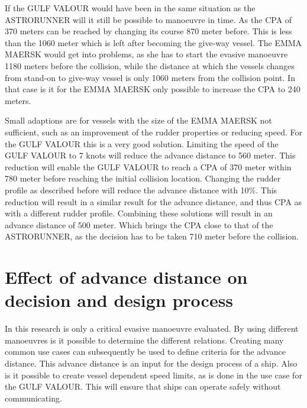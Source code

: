 If the GULF VALOUR would have been in the same situation as the ASTRORUNNER will it still be possible to manoeuvre in time. As the CPA of 370 meters can be reached by changing its course 870 meter before. This is less than the 1060 meter which is left after becoming the give-way vessel. 
The EMMA MAERSK would get into problems, as she has to start the evasive manoeuvre 1180 meters before the collision, while the distance at which the vessels changes from stand-on to give-way vessel is only 1060 meters from the collision point. In that case is it for the EMMA MAERSK only possible to increase the CPA to 240 meters.

Small adaptions are for vessels with the size of the EMMA MAERSK not sufficient, such as an improvement of the rudder properties or reducing speed. For the GULF VALOUR this is a very good solution. Limiting the speed of the GULF VALOUR to 7 knots will reduce the advance distance to 560 meter. This reduction will enable the GULF VALOUR to reach a CPA of 370 meter within 780 meter before reaching the initial collision location.
Changing the rudder profile as described before will reduce the advance distance with 10\%. This reduction will result in a similar result for the advance distance, and thus CPA as with a different rudder profile.
Combining these solutions will result in an advance distance of 500 meter. Which brings the CPA close to that of the ASTRORUNNER, as the decision has to be taken 710 meter before the collision.


\section{Effect of advance distance on decision and design process}
In this research is only a critical evasive manoeuvre evaluated. By using different manoeuvres is it possible to determine the different relations. Creating many common use cases can subsequently be used to define criteria for the advance distance. This advance distance is an input for the design process of a ship. Also is it possible to create vessel dependent speed limits, as is done in the use case for the GULF VALOUR. This will ensure that ships can operate safely without communicating.

